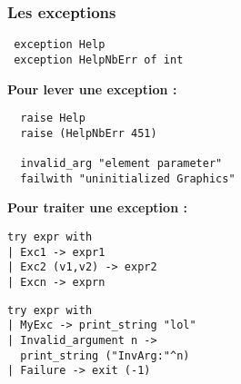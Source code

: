 \begin{frame}[fragile]
	\frametitle{Les exceptions}
	\begin{lstlisting}
 exception Help
 exception HelpNbErr of int
	\end{lstlisting}
	\textbf{Pour lever une exception :}
	\begin{lstlisting}
  raise Help
  raise (HelpNbErr 451)
  
  invalid_arg "element parameter"
  failwith "uninitialized Graphics"
	\end{lstlisting}
	\textbf{Pour traiter une exception :}
	\begin{center}
		\begin{minipage}{4.2cm}
			\lstset{basicstyle=\scriptsize}
			\begin{lstlisting}
try expr with 
| Exc1 -> expr1
| Exc2 (v1,v2) -> expr2
| Excn -> exprn
			\end{lstlisting}
		\end{minipage}
		\begin{minipage}{5cm}
			\lstset{basicstyle=\scriptsize}
			\begin{lstlisting}
try expr with 
| MyExc -> print_string "lol"
| Invalid_argument n -> 
  print_string ("InvArg:"^n)
| Failure -> exit (-1)
			\end{lstlisting}
		\end{minipage}
	\end{center}
\end{frame}
